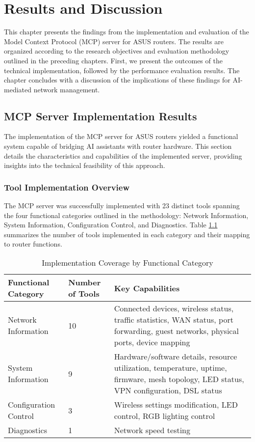 \chapter{Results and Discussion}
\label{chap:compiling}

This chapter presents the findings from the implementation and evaluation of the Model Context Protocol (MCP) server for ASUS routers. The results are organized according to the research objectives and evaluation methodology outlined in the preceding chapters. First, we present the outcomes of the technical implementation, followed by the performance evaluation results. The chapter concludes with a discussion of the implications of these findings for AI-mediated network management.

\section{MCP Server Implementation Results}
The implementation of the MCP server for ASUS routers yielded a functional system capable of bridging AI assistants with router hardware. This section details the characteristics and capabilities of the implemented server, providing insights into the technical feasibility of this approach.

\subsection{Tool Implementation Overview}
The MCP server was successfully implemented with 23 distinct tools spanning the four functional categories outlined in the methodology: Network Information, System Information, Configuration Control, and Diagnostics. Table \ref{tab:implementation-coverage} summarizes the number of tools implemented in each category and their mapping to router functions.

\begin{table}[htbp]
\caption{Implementation Coverage by Functional Category}
\label{tab:implementation-coverage}
\begin{tabular}{|p{4cm}|p{3cm}|p{7cm}|}
\hline
\textbf{Functional Category} & \textbf{Number of Tools} & \textbf{Key Capabilities} \\ \hline
Network Information & 10 & Connected devices, wireless status, traffic statistics, WAN status, port forwarding, guest networks, physical ports, device mapping \\ \hline
System Information & 9 & Hardware/software details, resource utilization, temperature, uptime, firmware, mesh topology, LED status, VPN configuration, DSL status \\ \hline
Configuration Control & 3 & Wireless settings modification, LED control, RGB lighting control \\ \hline
Diagnostics & 1 & Network speed testing \\ \hline
\end{tabular}
\end{table}


